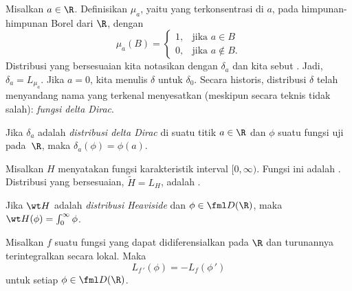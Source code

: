 \begin{notn} Misalkan $a \in \R$. Definisikan $\mu_a$, yaitu
 yang terkonsentrasi di $a$, pada himpunan-himpunan Borel dari $\R$, dengan
   \[ \mu_a(B) = \begin{cases}  1, &\text{jika $a \in B$} \\
                                0, &\text{jika $a \notin B$}.
                 \end{cases} \]
Distribusi yang bersesuaian kita notasikan dengan $\delta_a$ dan kita sebut
. Jadi, $\delta_a = L_{\mu_a}$. Jika $a = 0$, kita menulis $\delta$ untuk $\delta_0$.
Secara historis, distribusi $\delta$ telah menyandang nama yang terkenal menyesatkan (meskipun secara teknis
tidak salah): \emph{fungsi delta Dirac}.
\end{notn}

\begin{exam} Jika $\delta_a$ adalah \emph{distribusi delta Dirac} di suatu titik $a \in \R$ dan $\phi$ suatu fungsi uji pada~$\R$,
maka $\delta_a(\phi) = \phi(a)$.
\end{exam}

\begin{notn} Misalkan $H$ menyatakan fungsi karakteristik interval $[0,\infty)$. Fungsi ini adalah
. Distribusi yang bersesuaian, $\widetilde H = L_H$, adalah
.
\end{notn}

\begin{exam} Jika $\wt H$ adalah \emph{distribusi Heaviside} dan $\phi \in \fml D(\R)$, maka $\wt H(\phi) = \int_0^\infty \phi$.
\end{exam}

\begin{exam} Misalkan $f$ suatu fungsi yang dapat didiferensialkan pada $\R$ dan turunannya terintegralkan secara lokal. Maka
    \begin{equation}\label{deriv_reg_distr}
        L_{f\,'}(\phi) = -L_f(\phi\,')
    \end{equation}
untuk setiap $\phi \in \fml D(\R)$.
\end{exam}

